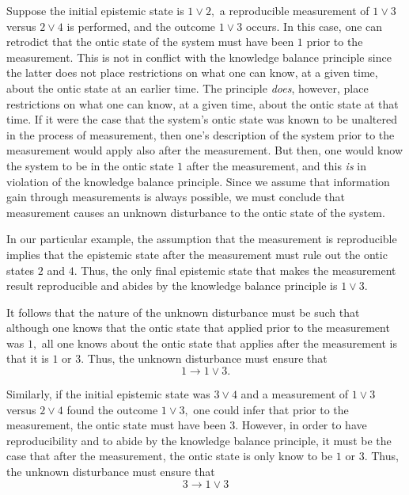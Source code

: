 \documentclass[pra,twocolumn,nofootinbib,showpacs]{revtex4}
\begin{document}
Suppose the initial epistemic state is $1\vee 2,$ a reproducible measurement
of $1\vee 3$ versus $2\vee 4$ is performed, and the outcome $1\vee 3$
occurs. In this case, one can retrodict that the ontic state of the system
must have been $1$ prior to the measurement. This is not in conflict with
the knowledge balance principle since the latter does not place restrictions
on what one can know, at a given time, about the ontic state at an earlier
time. The principle \emph{does}, however, place restrictions on what one can
know, at a given time, about the ontic state at that time. If it were the
case that the system's ontic state was known to be unaltered in the process
of measurement, then one's description of the system prior to the
measurement would apply also after the measurement. But then, one would know
the system to be in the ontic state $1$ after the measurement, and this
\emph{is} in violation of the knowledge balance principle. Since we assume
that information gain through measurements is always possible, we must
conclude that measurement causes an unknown disturbance to the ontic state
of the system.

In our particular example, the assumption that the measurement is
reproducible implies that the epistemic state after the measurement must
rule out the ontic states $2$ and $4$. Thus, the only final epistemic state
that makes the measurement result reproducible and abides by the knowledge
balance principle is $1\vee 3.$

It follows that the nature of the unknown disturbance must be such that
although one knows that the ontic state that applied prior to the
measurement was $1,$ all one knows about the ontic state that applies after
the measurement is that it is $1$ or $3.$ Thus, the unknown disturbance must
ensure that
\begin{equation}
1\rightarrow 1\vee 3.
\end{equation}

Similarly, if the initial epistemic state was $3\vee 4$ and a measurement of
$1\vee 3$ versus $2\vee 4$ found the outcome $1\vee 3,$ one could infer that
prior to the measurement, the ontic state must have been $3.$ However, in
order to have reproducibility and to abide by the knowledge balance
principle, it must be the case that after the measurement, the ontic state
is only know to be $1$ or $3.$ Thus, the unknown disturbance must ensure
that
\begin{equation}
3\rightarrow 1\vee 3
\end{equation}
\end{document}
